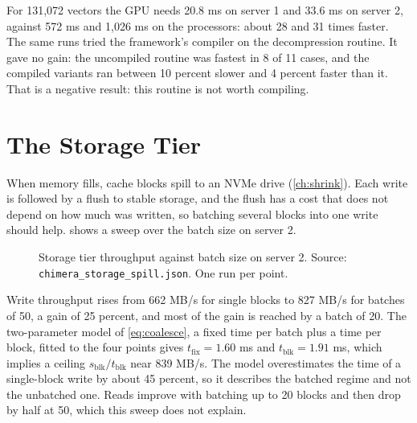 For 131,072 vectors the GPU needs 20.8 ms on server 1 and 33.6 ms on server 2,
against 572 ms and 1,026 ms on the processors: about 28 and 31 times faster.
The same runs tried the framework's compiler on the decompression routine. It
gave no gain: the uncompiled routine was fastest in 8 of 11 cases, and the
compiled variants ran between 10 percent slower and 4 percent faster than
it. That is a negative result: this routine is not worth compiling.

\FloatBarrier
\section{The Storage Tier}
\label{sec:res-nvme}

When memory fills, cache blocks spill to an NVMe drive (\cref{ch:shrink}).
Each write is followed by a flush to stable storage, and the flush has a cost
that does not depend on how much was written, so batching several blocks into
one write should help.  shows a sweep over the batch size on
server 2.

\begin{figure}[htbp]
  \centering
  \caption[Storage tier throughput against batch size on server 2]{Storage tier throughput against batch size on server 2. Source: \nolinkurl{chimera_storage_spill.json}. One run per point.}
  \label{fig:nvme}
\end{figure}

Write throughput rises from 662 MB/s for single blocks to 827 MB/s for
batches of 50, a gain of 25 percent, and most of the gain is reached by a
batch of 20. The two-parameter model of \cref{eq:coalesce}, a fixed time per
batch plus a time per block, fitted to the four points gives
$t_{\text{fix}} = 1.60$ ms and $t_{\text{blk}} = 1.91$ ms, which implies a
ceiling $s_{\text{blk}} / t_{\text{blk}}$ near 839 MB/s. The model overestimates the time of
a single-block write by about 45 percent, so it describes the batched regime
and not the unbatched one. Reads improve with batching up to 20 blocks
and then drop by half at 50, which this sweep does not explain.

